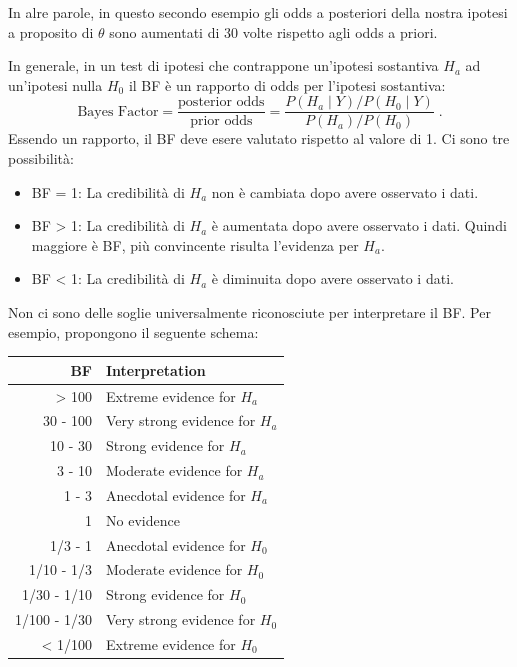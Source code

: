 \documentclass[
  11pt,
  italian,
  a4paper,
  extrafontsizes,onecolumn,openright
  ]{memoir}
\providecommand{\tightlist}{%
  \setlength{\itemsep}{0pt}\setlength{\parskip}{0pt}}
\begin{document}
\noindent
In alre parole, in questo secondo esempio gli odds a posteriori della nostra ipotesi a proposito di \(\theta\) sono aumentati di 30 volte rispetto agli odds a priori.

In generale, in un test di ipotesi che contrappone un'ipotesi sostantiva \(H_a\) ad un'ipotesi nulla \(H_0\) il BF è un rapporto di odds per l'ipotesi sostantiva:
\[
\text{Bayes Factor}
= \frac{\text{posterior odds}}{\text{prior odds}}
= \frac{P(H_a \mid Y) / P(H_0 \mid Y)}{P(H_a) / P(H_0)}
 \; .
\]
Essendo un rapporto, il BF deve esere valutato rispetto al valore di 1. Ci sono tre possibilità:

\begin{itemize}
\tightlist
\item
  BF = 1: La credibilità di \(H_a\) non è cambiata dopo avere osservato i dati.
\item
  BF \textgreater{} 1: La credibilità di \(H_a\) è aumentata dopo avere osservato i dati. Quindi maggiore è BF, più convincente risulta l'evidenza per \(H_a\).
\item
  BF \textless{} 1: La credibilità di \(H_a\) è diminuita dopo avere osservato i dati.
\end{itemize}

Non ci sono delle soglie universalmente riconosciute per interpretare il BF. Per esempio, \textcite{lee2014bayesian} propongono il seguente schema:

\begin{longtable}[]{@{}rl@{}}
\toprule
BF & Interpretation \\
\midrule
\endhead
\textgreater{} 100 & Extreme evidence for \(H_a\) \\
30 - 100 & Very strong evidence for \(H_a\) \\
10 - 30 & Strong evidence for \(H_a\) \\
3 - 10 & Moderate evidence for \(H_a\) \\
1 - 3 & Anecdotal evidence for \(H_a\) \\
1 & No evidence \\
1/3 - 1 & Anecdotal evidence for \(H_0\) \\
1/10 - 1/3 & Moderate evidence for \(H_0\) \\
1/30 - 1/10 & Strong evidence for \(H_0\) \\
1/100 - 1/30 & Very strong evidence for \(H_0\) \\
\textless{} 1/100 & Extreme evidence for \(H_0\) \\
\bottomrule
\end{longtable}
\end{document}
